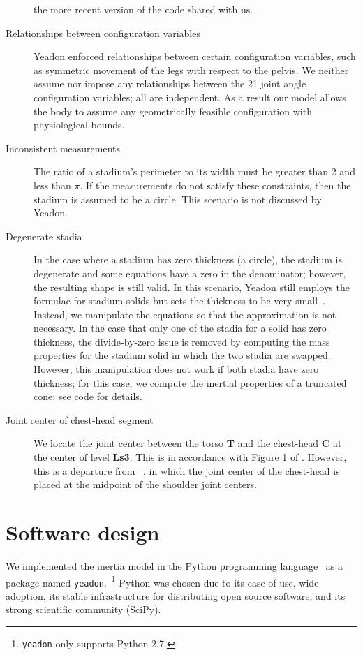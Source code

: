 \documentclass[10pt,a4paper,twocolumn]{article}
\begin{document}
\begin{description}
      the more recent version of the code shared with us.
    \item[Relationships between configuration variables] Yeadon enforced
      relationships between certain configuration variables, such as symmetric
      movement of the legs with respect to the pelvis. We neither assume nor
      impose any relationships between the 21 joint angle configuration
      variables; all are independent. As a result our model allows the body to
      assume any geometrically feasible configuration with physiological
      bounds.
    \item[Inconsistent measurements] The ratio of a stadium's perimeter to its
      width must be greater than 2 and less than $\pi$. If the measurements do
      not satisfy these constraints, then the stadium is assumed to be a
      circle. This scenario is not discussed by Yeadon.
    \item[Degenerate stadia] In the case where a stadium has zero thickness (a
      circle), the stadium is degenerate and some equations have a zero in the
      denominator; however, the resulting shape is still valid. In this
      scenario, Yeadon still employs the formulae for stadium solids but sets
      the thickness to be very small~\cite{Yeadon1990f}.  Instead, we
      manipulate the equations so that the approximation is not necessary. In
      the case that only one of the stadia for a solid has zero thickness, the
      divide-by-zero issue is removed by computing the mass properties for the
      stadium solid in which the two stadia are swapped. However, this
      manipulation does not work if both stadia have zero thickness; for this
      case, we compute the inertial properties of a truncated cone; see code
      for details.
    \item[Joint center of chest-head segment] We locate the joint center
      between the torso \textbf{T} and the chest-head \textbf{C} at the center
      of level \textbf{Ls3}. This is in accordance with Figure 1 of
      \cite{Yeadon1990e}. However, this is a departure from
      ~\cite{Yeadon1984a}, in which the joint center of the chest-head is
      placed at the midpoint of the shoulder joint centers.
\end{description}

\section*{Software design}

We implemented the inertia model in the Python programming
language~\cite{Python2014} as a package named
\verb+yeadon+.~\cprotect\footnote{\verb+yeadon+ only supports Python 2.7.}
Python was chosen due to its ease of use, wide adoption, its stable
infrastructure for distributing open source software, and its strong scientific
community (\href{http://www.scipy.org}{SciPy}).
\end{document}

